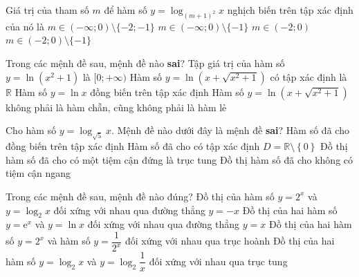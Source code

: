 \begin{ex}%
	Giá  trị của tham số $m$ để hàm số $y=\log_{(m+1)^2} x$ nghịch biến trên tập xác định của nó là
	\choice 
		 {$m \in(-\infty;0) \setminus\{-2;-1\}$}
		 {$m \in(-\infty;0) \setminus\{-1\}$}
		{$m \in(-2;0)$} 
		{\True $m \in(-2;0) \setminus\{-1\}$} 
\end{ex}

\begin{ex}%
	Trong các mệnh  đề sau, mệnh đề nào \textbf{sai}?
	\choice 
		{Tập giá trị của hàm  số $y=\ln(x^2+1)$ là $[0;+\infty)$}
		{Hàm số $y=\ln \left(x+\sqrt{x^2+1}\right)$ có tập xác định là  $\mathbb{R}$}
		{Hàm số $y=\ln x$ đồng biến trên  tập xác định}
		{\True Hàm số $y=\ln \left(x+\sqrt{x^2+1}\right)$ không phải là hàm chẵn, cũng không phải là hàm  lẻ}
\end{ex}

\begin{ex}%
	Cho hàm số $y=\log_{\sqrt{5}}x$.  Mệnh đề nào dưới đây là mệnh đề \textbf{sai}?
	 \choice
		{Hàm  số đã cho đồng biến trên tập xác định}
		{\True Hàm số đã cho có tập xác định $D=\mathbb{R} \setminus  \left\{0\right\}$}
		{Đồ thị hàm số đã cho có một tiệm cận  đứng là trục tung}
		{Đồ thị hàm số đã cho không có tiệm  cận ngang}
\end{ex}

\begin{ex}%
	Trong các mệnh đề sau, mệnh  đề nào đúng?
	 \choice
		{Đồ thị của hàm số $y=2^x$ và $y=\log_2 x$ đối  xứng với nhau qua đường thẳng $y=-x$}
		{\True Đồ thị  của hai hàm số $y=\mathrm{e}^x$ và $y=\ln x$ đối xứng với nhau qua đường thẳng $y=x$}
		{Đồ thị  của hai hàm số $y=2^x$ và hàm số $y=\dfrac{1}{2^x}$ đối xứng với nhau qua trục hoành}
		{Đồ thị của hai hàm số $y=\log_2 x$  và $y=\log_2 \dfrac{1}{x}$ đối xứng với nhau qua trục tung}
\end{ex}

